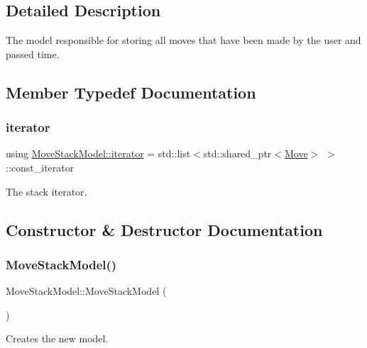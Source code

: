 \subsection{Detailed Description}
The model responsible for storing all moves that have been made by the user and passed time. 



\subsection{Member Typedef Documentation}
\mbox{\label{class_move_stack_model_a64b3cd5b744e18ce4cebd87957b2f3fa}} 
\subsubsection{\texorpdfstring{iterator}{iterator}}
{\footnotesize\ttfamily using \mbox{\hyperlink{class_move_stack_model_a64b3cd5b744e18ce4cebd87957b2f3fa}{Move\+Stack\+Model\+::iterator}} =  std\+::list$<$std\+::shared\+\_\+ptr$<$\mbox{\hyperlink{struct_move}{Move}}$>$ $>$\+::const\+\_\+iterator}



The stack iterator. 



\subsection{Constructor \& Destructor Documentation}
\mbox{\label{class_move_stack_model_aaed956e471dc01eb1c996001e2d3751b}} 
\subsubsection{\texorpdfstring{MoveStackModel()}{MoveStackModel()}}
{\footnotesize\ttfamily Move\+Stack\+Model\+::\+Move\+Stack\+Model (\begin{DoxyParamCaption}{ }\end{DoxyParamCaption})}



Creates the new model. 



